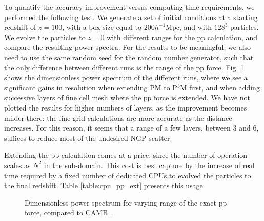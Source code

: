  To quantify the accuracy improvement versus computing time requirements, we performed the following test.
 We generate a set of initial conditions at a starting redshift of $z = 100$, with a box size equal to $ 200 h^{-1}\mbox{Mpc}$,
 and with $128^{3}$ particles. We evolve the particles to $z=0$ with different ranges for the pp calculation, and compare 
 the resulting power spectra. For the results to be meaningful, we also need to use the same random seed for the random number generator,
 such that the only difference between different runs is the range of the pp force.
 Fig. \ref{fig:power} shows the dimensionless power spectrum of the different runs, where we see a significant gains in resolution
 when extending  PM to P$^{3}$M first, and when adding successive layers of fine cell mesh where the pp force is extended.
We have not plotted the results for higher numbers of layers, as the improvement becomes milder there: the fine grid calculations
are more accurate as the distance increases. For this reason, it seems that a range of a few layers, between 3 and 6, suffices 
to reduce most of the undesired NGP scatter.

Extending the pp calculation comes at a price, since the number of operation scales as  $N^{2}$ in the sub-domain. 
This cost is best capture by the increase of real time required by a fixed number of dedicated  {\small CPU}s 
to evolved the particles to the final redshift. Table \ref{table:cpu_pp_ext} presents this usage.

\begin{figure}
  \begin{center}
  \caption{ Dimensionless power spectrum for varying range of the exact pp force, compared to  {\small CAMB} \citep{Lewis:1999bs}.}
    \label{fig:power}
  \end{center}
\end{figure}


